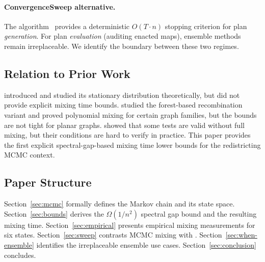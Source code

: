 \paragraph{ConvergenceSweep alternative.}
The \cs{} algorithm~\citep{b16paper} provides a deterministic $O(T \cdot n)$
stopping criterion for plan \emph{generation}.
For plan \emph{evaluation} (auditing enacted maps), ensemble methods remain
irreplaceable.
We identify the boundary between these two regimes.

\subsection{Relation to Prior Work}

\citet{deford2021} introduced \recom{} and studied its stationary
distribution theoretically, but did not provide explicit mixing time bounds.
\citet{autry2021} studied the forest-based recombination variant and proved
polynomial mixing for certain graph families, but the bounds are not tight
for planar graphs.
\citet{chikina2017} showed that some tests are valid without full mixing,
but their conditions are hard to verify in practice.
This paper provides the first explicit spectral-gap-based mixing time
lower bounds for the redistricting MCMC context.

\subsection{Paper Structure}

Section~\ref{sec:mcmc} formally defines the \recom{} Markov chain and
its state space.
Section~\ref{sec:bounds} derives the $\Omega(1/n^2)$ spectral gap bound
and the resulting mixing time.
Section~\ref{sec:empirical} presents empirical mixing measurements for
six states.
Section~\ref{sec:sweep} contrasts MCMC mixing with \cs{}.
Section~\ref{sec:when-ensemble} identifies the irreplaceable ensemble use cases.
Section~\ref{sec:conclusion} concludes.
